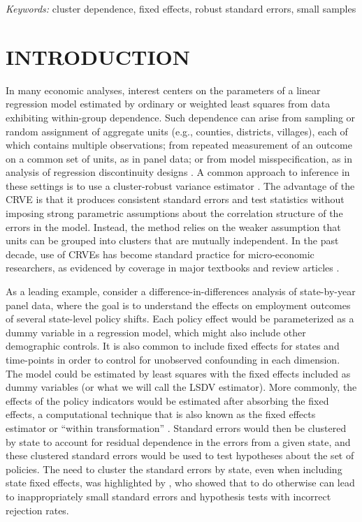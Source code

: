 \documentclass[12pt]{article}\usepackage[]{graphicx}\usepackage[]{color}
\begin{document}
\noindent%
{\it Keywords:} cluster dependence, fixed effects, robust standard errors, small samples
\vfill

\newpage
{} %


\section{INTRODUCTION}
\label{sec:intro}

In many economic analyses, interest centers on the parameters of a linear regression model estimated by ordinary or weighted least squares from data exhibiting within-group dependence. 
Such dependence can arise from sampling or random assignment of aggregate units (e.g., counties, districts, villages), each of which contains multiple observations; from repeated measurement of an outcome on a common set of units, as in panel data; or from model misspecification, as in analysis of regression discontinuity designs \citep[e.g.,][]{Lee2008regression}. 
A common approach to inference in these settings is to use a cluster-robust variance estimator \citep[CRVE;][]{Arellano1987computing, Liang1986longitudinal, white1984asymptotic}.
The advantage of the CRVE is that it produces consistent standard errors and test statistics without imposing strong parametric assumptions about the correlation structure of the errors in the model.
Instead, the method relies on the weaker assumption that units can be grouped into clusters that are mutually independent. 
In the past decade, use of CRVEs has become standard practice for micro-economic researchers, as evidenced by coverage in major textbooks and review articles \citep[e.g.,][]{Wooldridge2010econometric, Angrist2009mostly, Cameron2015practitioners}.

As a leading example, consider a difference-in-differences analysis of state-by-year panel data, where the goal is to understand the effects on employment outcomes of several state-level policy shifts. 
Each policy effect would be parameterized as a dummy variable in a regression model, which might also include other demographic controls. It is also common to include fixed effects for states and time-points in order to control for unobserved confounding in each dimension. 
The model could be estimated by least squares with the fixed effects included as dummy variables (or what we will call the LSDV estimator). More commonly, the effects of the policy indicators would be estimated after absorbing the fixed effects, a computational technique that is also known as the fixed effects estimator or ``within transformation'' \citep{Wooldridge2010econometric}. 
Standard errors would then be clustered by state to account for residual dependence in the errors from a given state, and these clustered standard errors would be used to test hypotheses about the set of policies.
The need to cluster the standard errors by state, even when including state fixed effects, was highlighted by \citet{Bertrand2004how}, who showed that to do otherwise can lead to inappropriately small standard errors and hypothesis tests with incorrect rejection rates. 
\end{document}

